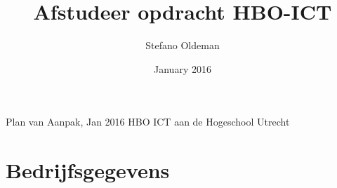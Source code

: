 \documentclass{report} %
\title{Afstudeer opdracht HBO-ICT}
\author{Stefano Oldeman}
\date{January 2016}
\begin{document}
\begin{titlepage}

\begin{center}
    
    Plan van Aanpak, Jan 2016
    HBO ICT aan de Hogeschool Utrecht
    
\end{center}
\end{titlepage}


\maketitle


\tableofcontents{}








\appendix
 
\chapter{Bedrijfsgegevens} %



\printbibliography
\end{document}
